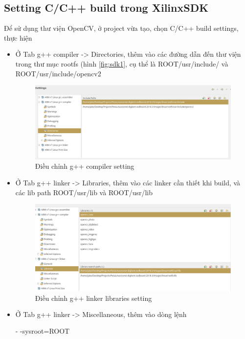 \documentclass[a4paper]{report}
\begin{document}
\subsection*{Setting C/C++ build trong XilinxSDK}
Để sử dụng thư viện OpenCV, ở project vừa tạo, chọn C/C++ build settings, thực hiện
\begin{itemize}
\item Ở Tab g++ compiler -> Directories, thêm vào các đường dẫn đến thư viện trong thư mục rootfs (hình \ref{fig:sdk1}, cụ thể là ROOT/usr/include/ và ROOT/usr/include/opencv2

\begin{figure}[H]
\centering
\includegraphics[width=.8\textwidth]{../images/fig/sdk3.png}
\caption{Điều chỉnh g++ compiler setting}
\label{fig:sdk3}
\end{figure}

\item Ở Tab g++ linker -> Libraries, thêm vào các linker cần thiết khi build, và các lib path ROOT/usr/lib và ROOT/usr/lib

\begin{figure}[H]
\centering
\includegraphics[width=.8\textwidth]{../images/fig/sdk4.png}
\caption{Điều chỉnh g++ linker libraries setting}
\label{fig:sdk4}
\end{figure}

\item Ở Tab g++ linker -> Miscellaneous, thêm vào dòng lệnh 

\begin{mdframed}[linecolor=black]
- -sysroot=ROOT
\end{mdframed} 



\end{itemize}
\end{document}
